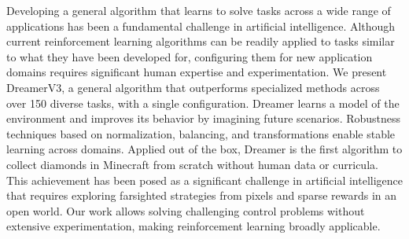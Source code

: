 Developing a general algorithm that learns to solve tasks across a wide range of applications has been a fundamental challenge in artificial intelligence.
Although current reinforcement learning algorithms can be readily applied to tasks similar to what they have been developed for, configuring them for new application domains requires significant human expertise and experimentation.
We present DreamerV3, a general algorithm that outperforms specialized methods across over 150 diverse tasks, with a single configuration.
Dreamer learns a model of the environment and improves its behavior by imagining future scenarios.
Robustness techniques based on normalization, balancing, and transformations enable stable learning across domains.
Applied out of the box, Dreamer is the first algorithm to collect diamonds in Minecraft from scratch without human data or curricula.
This achievement has been posed as a significant challenge in artificial intelligence that requires exploring farsighted strategies from pixels and sparse rewards in an open world.
Our work allows solving challenging control problems without extensive experimentation, making reinforcement learning broadly applicable.
